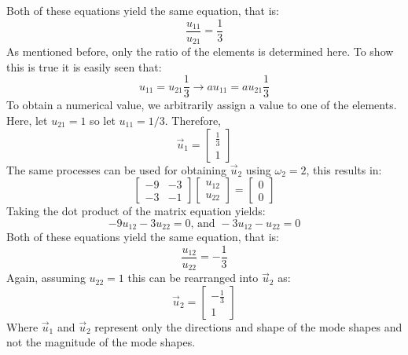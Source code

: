 \documentclass[12pt,letter]{article}
\begin{document}
\begin{example}
\begin{equation}
	\end{equation}
	Both of these equations yield the same equation, that is:
	\begin{equation}
		\frac{u_{11}}{u_{21}} =\frac{1}{3}
	\end{equation}
	As mentioned before, only the ratio of the elements is determined here. To show this is true it is easily seen that:
	\begin{equation}
		u_{11}=u_{21}\frac{1}{3} \rightarrow  a u_{11}= a u_{21}\frac{1}{3} 
	\end{equation}
	To obtain a numerical value, we arbitrarily assign a value to one of the elements. Here, let $u_{21}=1$ so  let $u_{11}=1/3$. Therefore, 
	\begin{equation}
		 \vec{u}_1 = \begin{bmatrix} \frac{1}{3}\\ 1\end{bmatrix}
	\end{equation}
	The same processes can be used for obtaining $\vec{u}_2$ using $\omega_2=2$, this results in:
	\begin{equation}
		 \begin{bmatrix} -9 & -3 \\    -3  & -1 \end{bmatrix} 
		 \begin{bmatrix} u_{12}\\ u_{22}\end{bmatrix}=\begin{bmatrix} 0\\ 0\end{bmatrix}
	\end{equation}
	Taking the dot product of the matrix equation yields:
	\begin{equation}
		-9u_{12} -3u_{22}=0 \text{, and } -3u_{12} - u_{22}=0
	\end{equation}
	Both of these equations yield the same equation, that is:
	\begin{equation}
		\frac{u_{12}}{u_{22}} =-\frac{1}{3}
	\end{equation}
	Again, assuming $u_{22}=1$  this can be rearranged into $\vec{u}_2$ as:
	\begin{equation}
		 \vec{u}_2 = \begin{bmatrix} -\frac{1}{3}\\ 1\end{bmatrix}
	\end{equation}
	Where $\vec{u}_1$ and $\vec{u}_2$ represent only the directions and shape of the mode shapes and not the magnitude of the mode shapes. 


\end{example}
\end{document}
